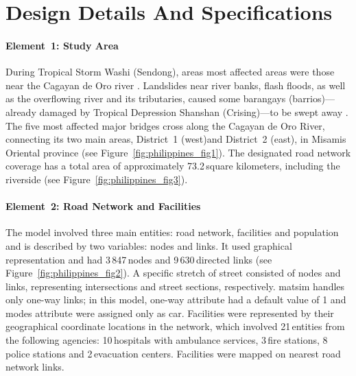 \section{Design Details And Specifications}
\paragraph{Element~1: Study Area}
During Tropical Storm Washi (Sendong), areas most affected areas were those near the Cagayan de Oro river \citep[][]{Ramos_TechRep_NDRRMC_2011}. Landslides near river banks, flash floods, as well as the overflowing river and its tributaries, caused some barangays (barrios)---already damaged by Tropical Depression Shanshan (Crising)---to be swept away \citep[][]{Delrosario_TechRep_NDRRMC_2011}. The five most affected major bridges cross along the Cagayan de Oro River, connecting its two main areas, District~1 (west)and District~2 (east), in Misamis Oriental province (see Figure~\ref{fig:philippines_fig1}). The designated road network coverage has a total area of approximately 73.2\,square kilometers, including the riverside (see Figure~\ref{fig:philippines_fig3}). 

\paragraph{Element~2: Road Network and Facilities}
The model involved three main entities: road network, facilities and population and is described by two variables: nodes and links. It used graphical representation and had 3\,847\,nodes and 9\,630\,directed links (see Figure~\ref{fig:philippines_fig2}). A specific stretch of street consisted of nodes and links, representing intersections and street sections, respectively. \gls{matsim} handles only one-way links; in this model, one-way attribute had a default value of 1 and modes attribute were assigned only as car.
Facilities were represented by their geographical coordinate locations in the network, which involved 21\,entities from the following agencies: 10\,hospitals with ambulance services, 3\,fire stations, 8\,police stations and 2\,evacuation centers. Facilities were mapped on nearest road network links.

